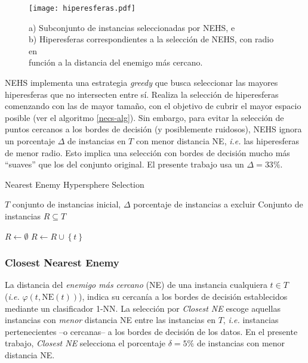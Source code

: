 \begin{figure}[h!]
\centering
\texttt{[image: hiperesferas.pdf]}
\caption[Selección obtenida por NEHS]{a) Subconjunto de instancias seleccionadas por NEHS, e\\b) Hiperesferas correspondientes a la selección de NEHS, con radio en\\función a la distancia del enemigo más cercano.}
\label{seleccion}
\end{figure}

NEHS implementa una estrategia \emph{greedy} que busca seleccionar las mayores hiperesferas que no intersecten entre sí. Realiza la selección de hiperesferas comenzando con las de mayor tamaño, con el objetivo de cubrir el mayor espacio posible (ver el algoritmo \ref{necs-alg}). Sin embargo, para evitar la selección de puntos cercanos a los bordes de decisión (y posiblemente ruidosos), NEHS ignora un porcentaje $\Delta$ de instancias en $T$ con menor distancia NE, \emph{i.e.} las hiperesferas de menor radio. Esto implica una selección con bordes de decisión mucho más ``suaves'' que los del conjunto original. El presente trabajo usa un $\Delta = 33\%$.

\begin{algorithm}
\caption{Nearest Enemy Hypersphere Selection}
\label{necs-alg}
\begin{algorithmic}[1]

\Require $T$ conjunto de instancias inicial, $\Delta$ porcentaje de instancias a excluir
\Ensure Conjunto de instancias $R \subseteq T$

\State $R \gets \emptyset$
		\State $R \gets R \cup \left\lbrace t \right\rbrace$
	\EndIf
\EndFor
\State {}
\end{algorithmic}
\end{algorithm}

\subsubsection{Closest Nearest Enemy}

La distancia del \emph{enemigo más cercano} (NE) de una instancia cualquiera $t \in T$ (\emph{i.e.} $\varphi(t,\mathrm{NE}(t))$), indica su cercanía a los bordes de decisión establecidos mediante un clasificador 1-NN. La selección por \emph{Closest NE} escoge aquellas instancias con \emph{menor} distancia NE entre las instancias en $T$, \emph{i.e.} instancias pertenecientes --o cercanas-- a los bordes de decisión de los datos. En el presente trabajo, \emph{Closest NE} selecciona el porcentaje $\delta = 5\%$ de instancias con menor distancia NE.

